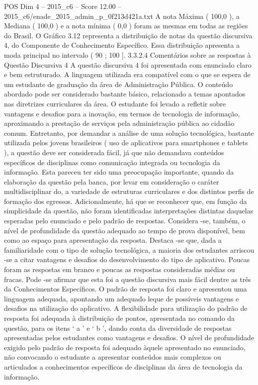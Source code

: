 \begin{textsample}{POS Dim 4 – 2015\_c6 – Score 12.00 – 2015\_c6/enade\_2015\_admin\_p\_0f213d421a.txt}
A nota Máxima ( 100,0 ), a Mediana ( 100,0 ) e a nota mínima ( 0,0 ) foram as mesmas em todas as regiões do Brasil.
O Gráfico 3.12 representa a distribuição de notas da questão discursiva 4, do Componente de Conhecimento Específico.
Essa distribuição apresenta a moda principal no intervalo ( 90 ; 100 ]. 3.3.2.4 Comentários sobre as respostas à Questão Discursiva 4 A questão discursiva 4 foi apresentada com enunciado claro e bem estruturado.
A linguagem utilizada era compatível com o que se espera de um estudante de graduação da área de Administração Pública.
O conteúdo abordado pode ser considerado bastante básico, relacionado a temas apontados nas diretrizes curriculares da área.
O estudante foi levado a refletir sobre vantagens e desafios para a inovação, em termos de tecnologia de informação, aproximando a prestação de serviços pela administração pública ao cidadão comum.
Entretanto, por demandar a análise de uma solução tecnológica, bastante utilizada pelos jovens brasileiros ( uso de aplicativos para smartphones e tablets ), a questão deve ser considerada fácil, já que não demandava conteúdos específicos de disciplinas como comunicação integrada ou tecnologia da informação.
Esta pareceu ter sido uma preocupação importante, quando da elaboração da questão pela banca, por levar em consideração o caráter multidisciplinar do, a variedade de estruturas curriculares e dos distintos perfis de formação dos egressos.
Adicionalmente, há que se reconhecer que, em função da simplicidade da questão, não foram identificadas interpretações distintas daquelas esperadas pelo enunciado e pelo padrão de respostas.
Considera -se, também, o nível de profundidade da questão adequado ao tempo de prova disponível, bem como ao espaço para apresentação da resposta.
Destaca -se que, dada a familiaridade com o tipo de solução tecnológica, a maioria dos estudantes arriscou -se a citar vantagens e desafios do desenvolvimento do tipo de aplicativo.
Poucas foram as respostas em branco e poucas as respostas consideradas médias ou fracas.
Pode -se afirmar que esta foi a questão discursiva mais fácil dentre as três da Conhecimentos Específicos.
O padrão de resposta foi claro e apresentou uma linguagem adequada, apontando um adequado leque de possíveis vantagens e desafios na utilização do aplicativo.
A flexibilidade para utilização do padrão de resposta foi adequada à distribuição de pontos, apresentada no comando da questão, para os itens ‘ a ’ e ‘ b ’, dando conta da diversidade de respostas apresentadas pelos estudantes como vantagens e desafios.
O nível de profundidade exigido pelo padrão de resposta foi adequado àquele apresentado no enunciado, não convocando o estudante a apresentar conteúdos mais complexos ou articulados a conhecimentos específicos de disciplinas da área de tecnologia da informação.

\end{textsample}

